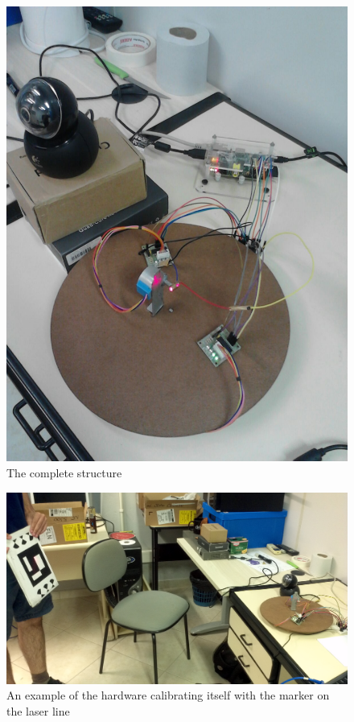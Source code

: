 \documentclass{article}
\begin{document}
\begin{figure}[h!]
    \includegraphics[scale=0.2]{imgs/hardware.jpg}
    \caption{The complete structure}
    \label{fig:hardware}
\end{figure}

\begin{figure}[h!]
    \includegraphics[scale=0.1]{imgs/marker_and_hardware.jpg}
    \caption{An example of the hardware calibrating itself with the marker on the 
laser line}
    \label{fig:h_and_m}
\end{figure}
\end{document}
